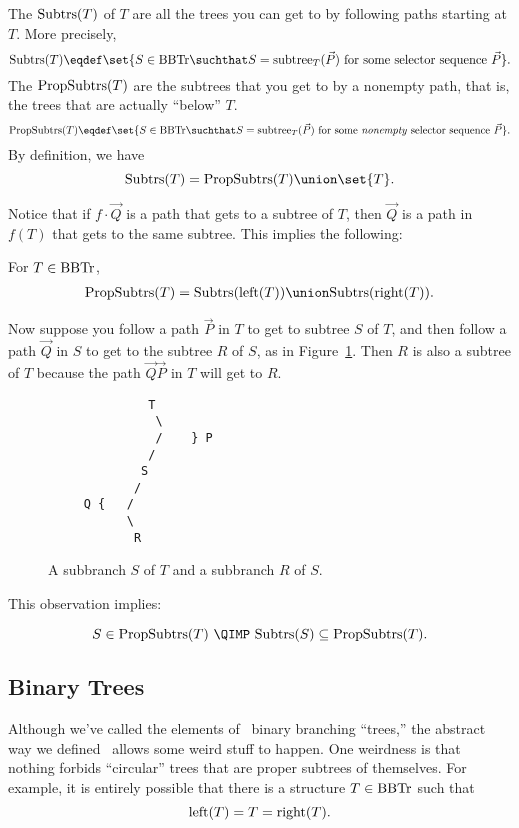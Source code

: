 The  $\text{Subtrs}(T)$ of $T$ are all the trees you can get
to by following paths starting at $T$.  More precisely,
\[
\subbrn{T} \eqdef \set{S \in \brnch \suchthat S =
  \rslt{T}{(\vec{P})}\ \text{for some selector sequence}\ \vec{P}}.
\]
The  $\text{PropSubtrs}(T)$ are the subtrees that you get
to by a nonempty path, that is, the trees that are actually ``below''
$T$.
\[
\propbrn{T} \eqdef \set{S \in \brnch \suchthat S =
  \rslt{T}{(\vec{P})}\ \text{for some \emph{nonempty} selector
    sequence}\ \vec{P}}.
\]
By definition, we have
\[
\subbrn{T} = \propbrn{T} \union \set{T}.
\]

Notice that if $f \cdot \vec{Q}$ is a path that gets to a subtree of
$T$, then $\vec{Q}$ is a path in $f(T)$ that gets to the same subtree.
This implies the following:
\begin{corollary}\label{unionLR}
For $T \in \text{BBTr}$,
\begin{align*}
\propbrn{T} = \subbrn{\leftsub{(T)}} \union \subbrn{\rightsub{(T)}}.
\end{align*}
\end{corollary}

Now suppose you follow a path $\vec{P}$ in $T$ to get to subtree $S$
of $T$, and then follow a path $\vec{Q}$ in $S$ to get to the subtree
$R$ of $S$, as in Figure~\ref{PQdown}.  Then $R$ is also a subtree of
$T$ because the path $\vec{Q}\vec{P}$ in $T$ will get to $R$.

\begin{figure}


\begin{center}
\begin{verbatim}
              T
               \
               /    } P
              /
             S
            /
     Q {   /
           \
            R
\end{verbatim}   
\end{center}

\caption{A subbranch $S$ of $T$ and  a subbranch $R$ of $S$.}

\label{PQdown}

\end{figure}

This observation implies:
\begin{corollary}\label{propsubbranch}
\[
 S \in \propbrn{T}\ \QIMP\ \subbrn{S} \subseteq \propbrn{T}.
\]
\end{corollary}


\subsection{Binary Trees}
Although we've called the elements of \brnch\ binary branching
``trees,'' the abstract way we defined \brnch\ allows some weird stuff
to happen.  One weirdness is that nothing forbids ``circular'' trees
that are proper subtrees of themselves.
\iffalse
For example, it is entirely
possible that there is a structure $T \in \text{BBTr}$ such that
\textcolor{red}{
\[
\text{left}(T) = T = \text{right}(T).
\]}

